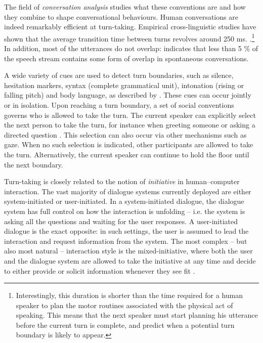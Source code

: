 The field of  \textit{conversation analysis} studies what these conventions are and how they combine to shape conversational behaviours. Human conversations are indeed remarkably efficient at turn-taking.  Empirical cross-linguistic studies have shown that the average transition time between turns revolves around 250 ms. \citep{Stivers30062009}.\footnote{Interestingly, this duration is shorter than the time required for a human speaker to plan the motor routines associated with the physical act of speaking.  This means that the next speaker must start planning his utterance before the current turn is complete, and predict when a potential turn boundary is likely to appear.} In addition, most of the utterances do not overlap: \cite{Levinson1983} indicates that less than 5 \% of the speech stream contains some form of overlap in spontaneous conversations.  

A wide variety of cues are used to detect turn boundaries, such as silence, hesitation markers, syntax (complete grammatical unit), intonation (rising or falling pitch) and body language, as described by \cite{Duncan1972}.   These cues can occur jointly or in isolation. Upon reaching a turn boundary, a set of social conventions governs who is allowed to take the turn.  The current speaker can explicitly select the next person to take the turn, for instance when greeting someone or asking a directed question \citep{sacks1974}.   This selection can also occur via other mechanisms such as gaze.  When no such selection is indicated, other participants are allowed to take the turn.  Alternatively, the current speaker can continue to hold the floor until the next boundary. 

Turn-taking is closely related to the notion of \textit{initiative} in human--computer interaction. The vast majority of dialogue systems currently deployed are either system-initiated or user-initiated.  In a system-initiated dialogue, the dialogue system has full control on how the interaction is unfolding -- i.e. the system is asking all the questions and waiting for the user responses.  A user-initiated dialogue is the exact opposite: in such settings, the user is assumed to lead the interaction and request information from the system.  The most complex -- but also most natural -- interaction style is the mixed-initiative, where both the user and the dialogue system are allowed to take the initiative at any time and decide to either provide or solicit information whenever they see fit \citep{Horvitz:1999}. 

